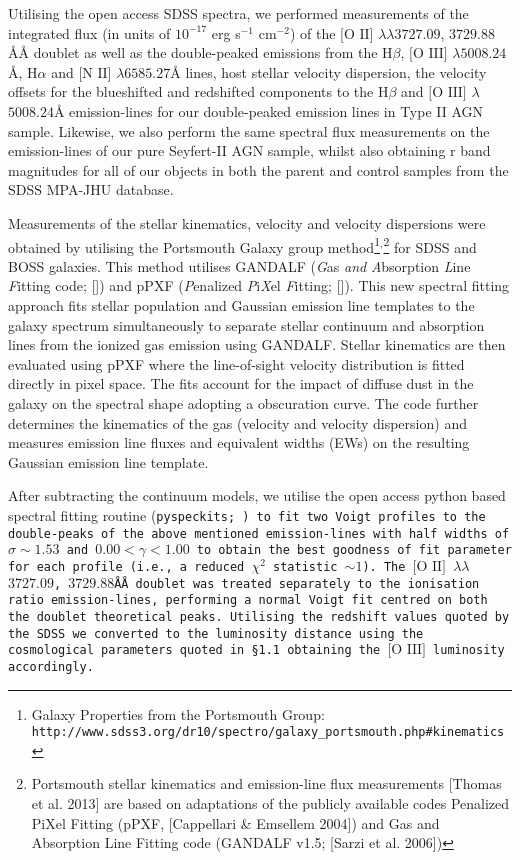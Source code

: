 Utilising the open access SDSS spectra, we performed measurements of the integrated flux (in units of $10^{-17}$ erg s$^{-1}$ cm$^{-2}$) of the $\text{[O II]}$ $\lambda\lambda$$3727.09$, $3729.88$\AA\AA{} doublet as well as the double-peaked emissions from the $\text{H}\beta$, $\text{[O III]}$ $\lambda$$5008.24$\AA{}, $\text{H}\alpha$ and $\text{[N II]}$ $\lambda$$6585.27$\AA{} lines, host stellar velocity dispersion, the velocity offsets for the blueshifted and redshifted components to the $\text{H}\beta$ and $\text{[O III]}$ $\lambda$$5008.24$\AA{} emission-lines for our double-peaked emission lines in Type II AGN sample. Likewise, we also perform the same spectral flux measurements on the emission-lines of our pure Seyfert-II AGN sample, whilst also obtaining r band magnitudes for all of our objects in both the parent and control samples from the SDSS MPA-JHU database. 

Measurements of the stellar kinematics, velocity and velocity dispersions were obtained by utilising the Portsmouth Galaxy group method\footnote{\tiny{Galaxy Properties from the Portsmouth Group: \tt{http://www.sdss3.org/dr10/spectro/galaxy_portsmouth.php#kinematics}}}$^{\text{,}}$\footnote{\tiny{Portsmouth stellar kinematics and emission-line flux measurements [Thomas et al. 2013] are based on adaptations of the publicly available codes Penalized PiXel Fitting (pPXF, [Cappellari \& Emsellem 2004]) and Gas and Absorption Line Fitting code (GANDALF v1.5; [Sarzi et al. 2006])}} for SDSS and BOSS galaxies. This method utilises GANDALF (\textit{G}as \textit{and} \textit{A}bsorption \textit{L}ine \textit{F}itting code; [\cite{Sarzi_2006}]) and pPXF (\textit{P}enalized \textit{P}i\textit{X}el \textit{F}itting; [\cite{2012ascl.soft10002C}]). This new spectral fitting approach fits stellar population and Gaussian emission line templates to the galaxy spectrum simultaneously to separate stellar continuum and absorption lines from the ionized gas emission using GANDALF. Stellar kinematics are then evaluated using pPXF where the line-of-sight velocity distribution is fitted directly in pixel space. The fits account for the impact of diffuse dust in the galaxy on the spectral shape adopting a \cite{Calzetti_2001} obscuration curve. The code further determines the kinematics of the gas (velocity and velocity dispersion) and measures emission line fluxes and equivalent widths (EWs) on the resulting Gaussian emission line template.

After subtracting the continuum models, we utilise the open access python based spectral fitting routine (\tt{pyspeckits}; \cite{2011ascl.soft09001G}) to fit two Voigt profiles to the double-peaks of the above mentioned emission-lines with half widths of $\sigma\sim{1.53}$ and ${0.00}<{\gamma}<{1.00}$ to obtain the best goodness of fit parameter for each profile (i.e., a reduced $\chi^{2}$ statistic $\sim{1}$). The $\text{[O II]}$ $\lambda\lambda$$3727.09$, $3729.88$\AA\AA{} doublet was treated separately to the ionisation ratio emission-lines, performing a normal Voigt fit centred on both the doublet theoretical peaks. Utilising the redshift values quoted by the SDSS we converted to the luminosity distance using the cosmological parameters quoted in §1.1 obtaining the $\text{[O III]}$ luminosity accordingly.
  
  
  
  
  
  
  
  